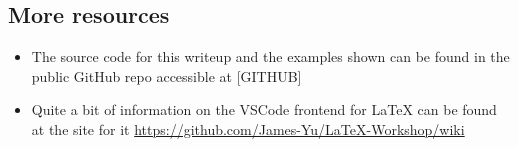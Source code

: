 \subsection{More resources}
\begin{itemize}
    \item 
    The source code for this writeup and the examples shown can be found in the public GitHub repo accessible at [GITHUB]
    
    \item 
    Quite a bit of information on the VSCode frontend for \LaTeX{} can be found at the site for it \url{https://github.com/James-Yu/LaTeX-Workshop/wiki}
\end{itemize}





%



    